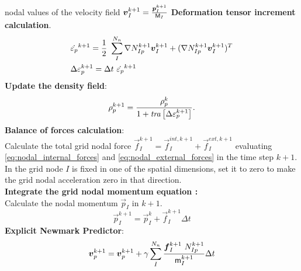 \begin{algorithm}
\begin{algorithmic}[1]
  nodal values of the velocity field $\vec{v}_{I}^{k+1} =
  \frac{\vec{p}_{I}^{k+1}}{\tens{M}_{I}}$
  \STATE \textbf{Deformation tensor increment calculation}.
  \begin{align*}
    &\dot{\tens{\varepsilon}_{p}}^{k+1} = \frac{1}{2}\ \sum_{I}^{N_n}
    \Grad{N_{Ip}^{k+1}}\vec{v}_{I}^{k+1} +
      (\Grad{N_{Ip}^{k+1}}\vec{v}_{I}^{k+1})^T \\
    &\Delta \tens{\varepsilon}_{p}^{k+1} = \Delta t\ \dot{\tens{\varepsilon}_{p}}^{k+1}
  \end{align*}
  \STATE \textbf{Update the density field}:\\
  \begin{equation*}
    \rho_p^{k+1} = \frac{\rho_p^k}{1 + \mathit{tra}\left[\Delta\mathsf{\varepsilon}_{p}^{k+1}\right]}.
  \end{equation*}
  \STATE \textbf{Balance of forces calculation}:\\
  Calculate the total grid nodal force $\vec{f}_{I}^{k+1} =
  \vec{f}_{I}^{int,k+1} + \vec{f}_{I}^{ext,k+1}$ evaluating
  \eqref{eq:nodal_internal_forces} and \eqref{eq:nodal_external_forces} in the time step $k+1$. In the
  grid node $I$ is fixed in one of the spatial dimensions, set it to
  zero to make the grid nodal acceleration zero in that direction.\\
  \STATE \textbf{Integrate the grid nodal momentum equation :}\\
  Calculate the nodal momentum $\vec{p}_{I}$ in $k+1$. 
  \begin{equation*}
    \vec{p}_{I}^{k+1} = \vec{p}_{I}^{k} + \vec{f}_{I}^{k+1}\Delta t
  \end{equation*}
  \STATE \textbf{Explicit Newmark Predictor}:
  \begin{equation*}
    \vec{v}_{p}^{k+1} = \vec{v}_{p}^{k+1} +
    \gamma \sum^{N_n}_{I}\frac{\vec{f}_{I}^{k+1}\ N_{Ip}^{k+1}}{\tens{m}_I^{k+1}}\Delta t  
  \end{equation*}
\end{algorithmic}
\end{algorithm} 

